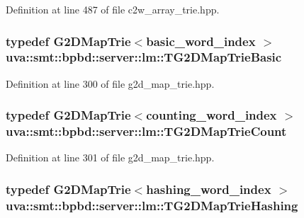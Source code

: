 Definition at line 487 of file c2w\+\_\+array\+\_\+trie.\+hpp.

\hypertarget{namespaceuva_1_1smt_1_1bpbd_1_1server_1_1lm_a0e8dd69db16d3a91b8f4fce171f626b4}{}
\subsubsection[{T\+G2\+D\+Map\+Trie\+Basic}]{\setlength{\rightskip}{0pt plus 5cm}typedef {\bf G2\+D\+Map\+Trie}$<${\bf basic\+\_\+word\+\_\+index} $>$ {\bf uva\+::smt\+::bpbd\+::server\+::lm\+::\+T\+G2\+D\+Map\+Trie\+Basic}}\label{namespaceuva_1_1smt_1_1bpbd_1_1server_1_1lm_a0e8dd69db16d3a91b8f4fce171f626b4}


Definition at line 300 of file g2d\+\_\+map\+\_\+trie.\+hpp.

\hypertarget{namespaceuva_1_1smt_1_1bpbd_1_1server_1_1lm_a7bd0f965d2b4e0b52b6986b4209dc3b8}{}
\subsubsection[{T\+G2\+D\+Map\+Trie\+Count}]{\setlength{\rightskip}{0pt plus 5cm}typedef {\bf G2\+D\+Map\+Trie}$<${\bf counting\+\_\+word\+\_\+index} $>$ {\bf uva\+::smt\+::bpbd\+::server\+::lm\+::\+T\+G2\+D\+Map\+Trie\+Count}}\label{namespaceuva_1_1smt_1_1bpbd_1_1server_1_1lm_a7bd0f965d2b4e0b52b6986b4209dc3b8}


Definition at line 301 of file g2d\+\_\+map\+\_\+trie.\+hpp.

\hypertarget{namespaceuva_1_1smt_1_1bpbd_1_1server_1_1lm_a3b5d2fae05ef641d6c84be4ca79062eb}{}
\subsubsection[{T\+G2\+D\+Map\+Trie\+Hashing}]{\setlength{\rightskip}{0pt plus 5cm}typedef {\bf G2\+D\+Map\+Trie}$<${\bf hashing\+\_\+word\+\_\+index} $>$ {\bf uva\+::smt\+::bpbd\+::server\+::lm\+::\+T\+G2\+D\+Map\+Trie\+Hashing}}\label{namespaceuva_1_1smt_1_1bpbd_1_1server_1_1lm_a3b5d2fae05ef641d6c84be4ca79062eb}


